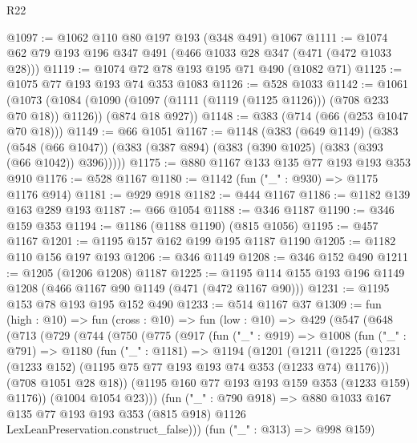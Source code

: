 \begin{lexlean}{R22}
\begin{coremodule}
@1097 := @1062 @110 @80 @197 @193 (@348 @491) @1067
@1111 := @1074 @62 @79 @193 @196 @347 @491 (@466 @1033 @28 @347 (@471 (@472 @1033 @28)))
@1119 := @1074 @72 @78 @193 @195 @71 @490 (@1082 @71)
@1125 := @1075 @77 @193 @193 @74 @353 @1083
@1126 := @528 @1033
@1142 := @1061
    (@1073
      (@1084 (@1090 (@1097 (@1111 (@1119 (@1125 @1126))) (@708 @233 @70 @18)) @1126))
      (@874 @18 @927))
@1148 := @383 (@714 (@66 (@253 @1047 @70 @18)))
@1149 := @66 @1051
@1167 := @1148
    (@383
      (@649 @1149)
      (@383
        (@548 (@66 @1047))
        (@383 (@387 @894) (@383 (@390 @1025) (@383 (@393 (@66 @1042)) @396)))))
@1175 := @880 @1167 @133 @135 @77 @193 @193 @353 @910
@1176 := @528 @1167
@1180 := @1142 (fun ("_" : @930) => @1175 @1176 @914)
@1181 := @929 @918
@1182 := @444 @1167
@1186 := @1182 @139 @163 @289 @193
@1187 := @66 @1054
@1188 := @346 @1187
@1190 := @346 @159 @353
@1194 := @1186 (@1188 @1190) (@815 @1056)
@1195 := @457 @1167
@1201 := @1195 @157 @162 @199 @195 @1187 @1190
@1205 := @1182 @110 @156 @197 @193
@1206 := @346 @1149
@1208 := @346 @152 @490
@1211 := @1205 (@1206 @1208) @1187
@1225 := @1195 @114 @155 @193 @196 @1149 @1208 (@466 @1167 @90 @1149 (@471 (@472 @1167 @90)))
@1231 := @1195 @153 @78 @193 @195 @152 @490
@1233 := @514 @1167 @37
@1309 := fun (high : @10) =>
  fun (cross : @10) =>
  fun (low : @10) =>
  @429
    (@547
      (@648
        (@713
          (@729
            (@744
              (@750
                (@775
                  (@917
                    (fun ("_" : @919) =>
                    @1008
                      (fun ("_" : @791) =>
                      @1180
                        (fun ("_" : @1181) =>
                        @1194
                          (@1201
                            (@1211
                              (@1225
                                (@1231
                                  (@1233 @152)
                                  (@1195 @75 @77 @193 @193 @74 @353 (@1233 @74) @1176)))
                              (@708 @1051 @28 @18))
                            (@1195 @160 @77 @193 @193 @159 @353 (@1233 @159) @1176))
                          (@1004 @1054 @23)))
                      (fun ("_" : @790 @918) =>
                      @880
                        @1033
                        @167
                        @135
                        @77
                        @193
                        @193
                        @353
                        (@815 @918)
                        @1126
                        LexLeanPreservation.construct_false)))
                  (fun ("_" : @313) => @998 @159)

\end{coremodule}
\end{lexlean}
